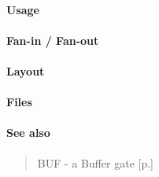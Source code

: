 \paragraph{Usage}

\paragraph{Fan-in / Fan-out}

\paragraph{Layout}

\paragraph{Files}

\paragraph{See also}
\begin{quote}
    BUF - a Buffer gate [p.\pageref{BUF}]
\end{quote}
